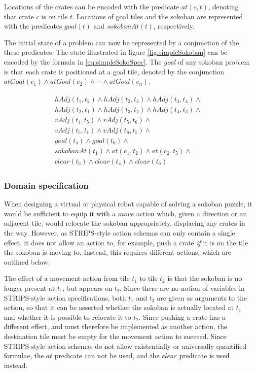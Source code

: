 \documentclass[../Master.tex]{subfiles}
\begin{document}
Locations of the crates can be encoded with the predicate $at(c, t)$, denoting that crate $c$ is on tile $t$. Locations of goal tiles and the sokoban are represented with the predicates $goal(t)$ and $sokobanAt(t)$, respectively.

The initial state of a problem can now be represented by a conjunction of the these predicates. The state illustrated in figure \ref{fig:simpleSokoban} can be encoded by the formula in \eqref{eq:simpleSokoSpec}. The \textit{goal} of any sokoban problem is that each crate is positioned at a goal tile, denoted by the conjunction $atGoal(c_1) \land atGoal(c_2) \land \cdots \land atGoal(c_n)$.

\begin{gather}
\begin{gathered} \label{eq:simpleSokoSpec}
    hAdj(t_1, t_2) \land hAdj(t_2, t_3) \land hAdj(t_3, t_4) \land \\
    hAdj(t_2, t_1) \land hAdj(t_3, t_2) \land hAdj(t_4, t_3) \land \\
    vAdj(t_1, t_5) \land vAdj(t_5, t_6) \land \\
    vAdj(t_5, t_1) \land vAdj(t_6, t_5) \land \\
    goal(t_4) \land goal(t_6) \land \\
    sokobanAt(t_1) \land at(c_1, t_2) \land at(c_2, t_5) \land \\
    clear(t_3) \land clear(t_4) \land clear(t_6)
\end{gathered}
\end{gather}

\subsubsection*{Domain specification}
When designing a virtual or physical robot capable of solving a sokoban puzzle, it would be sufficient to equip it with a $move$ action which, given a direction or an adjacent tile, would relocate the sokoban appropriately, displacing any crates in the way. However, as STRIPS-style action schemas can only contain a single effect, it does not allow an action to, for example, push a crate \textit{if}  it is on the tile the sokoban is moving to. Instead, this requires different actions, which are outlined below:

The effect of a movement action from tile $t_1$ to tile $t_2$ is that the sokoban is no longer present at $t_1$, but appears on $t_2$. Since there are no notion of variables in STRIPS-style action specifications, both $t_1$ and $t_2$ are given as arguments to the action, so that it can be asserted whether the sokoban is actually located at $t_1$ and whether it is possible to relocate it to $t_2$. Since pushing a crate has a different effect, and must therefore be implemented as another action, the destination tile must be empty for the movement action to succeed. Since STRIPS-style action schemas do not allow existentially or universally quantified formulae, the $at$ predicate can not be used, and the $clear$ predicate is used instead.
\end{document}
